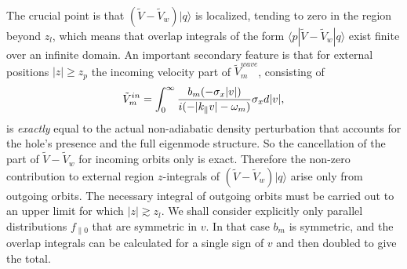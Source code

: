 \documentclass[12pt]{article}
\def\ket#1{|#1\rangle}
\def\bra#1{\langle#1}
\begin{document}
The crucial point is that $(\tilde{V}-\tilde{V}_{w})\ket{q}$ is
localized, tending to zero in the region beyond $z_l$, which means
that overlap integrals of the form
$\bra{p}|\tilde{V}-\tilde{V}_{w}\ket{q}$ exist finite over an infinite
domain. An important secondary feature is that for external positions
$|z|\ge z_p$ the incoming velocity part of $\tilde V_m^{wave}$,
consisting of
\begin{equation}
  \label{incoming}
  \tilde V_m^{in}= \int_{0}^\infty { b_m(-\sigma_x|v|) \over
    i(-|k_\parallel v|-\omega_m)}\sigma_x d|v|,
\end{equation}
is \emph{exactly} equal to the actual non-adiabatic density
perturbation that accounts for the hole's presence and the full
eigenmode structure. So the cancellation of the part of
$\tilde V-\tilde V_w$ for incoming orbits only is exact. Therefore the
non-zero contribution to external region $z$-integrals of
$(\tilde V-\tilde V_w)\ket{q}$ arise only from outgoing orbits. The
necessary integral of outgoing orbits must be carried out to an upper
limit for which $|z|\gtrsim z_l$. We shall consider explicitly only
parallel distributions $f_{\parallel0}$ that are symmetric in $v$. In
that case $b_m$ is symmetric, and the overlap integrals can be
calculated for a single sign of $v$ and then doubled to give the
total. 
\end{document}

